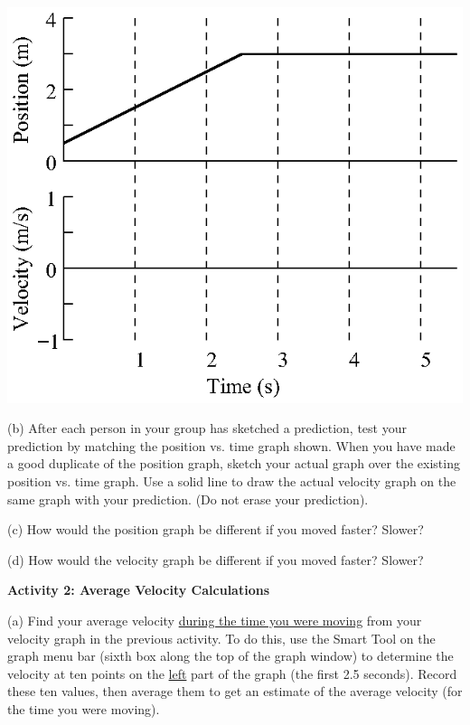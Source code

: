 \vspace{0.3cm}
{\par\centering \includegraphics{relating/relating_fig1.eps} \par}
\vspace{0.3cm}

(b) After each person in your group has sketched a prediction, test your prediction
by matching the position vs. time graph shown. When you have made a good duplicate
of the position graph, sketch your actual graph over the existing position vs.
time graph.
Use a solid line to draw the actual velocity graph on the same graph with
your prediction. (Do not erase your prediction).

(c) How would the position graph be different if you moved faster? Slower? 
\answerspace{20mm}

(d) How would the velocity graph be different if you moved faster? Slower? 
\answerspace{20mm}

\textbf{Activity 2: Average Velocity Calculations} 

(a) Find your average velocity \underline{during the time you were moving} from your velocity graph in the previous activity. To do this, use the Smart Tool on the graph menu bar (sixth box along the top of the graph window) to determine the velocity at ten points on the \underline{left} part of the graph (the first 2.5 seconds). Record these ten values, then average them to get an estimate of the average velocity (for the time you were moving).

